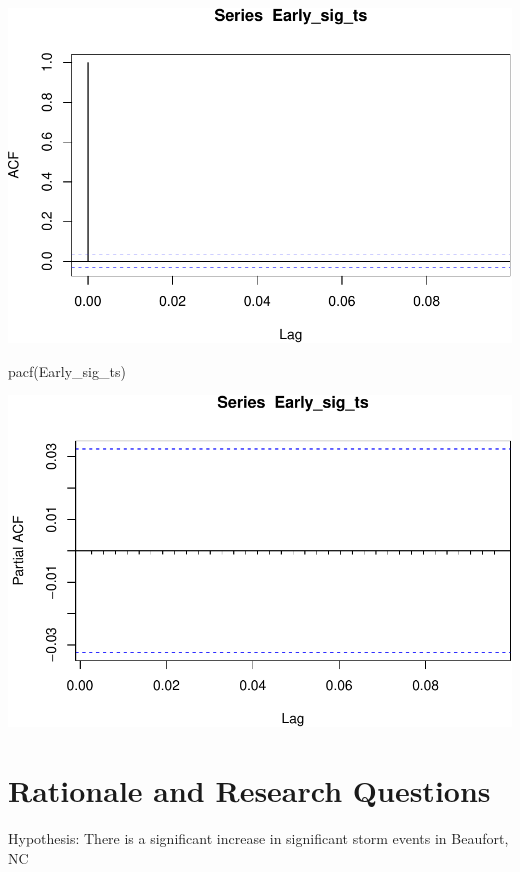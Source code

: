 \documentclass[
  12pt,
]{article}
\newenvironment{Shaded}{\begin{snugshade}}{\end{snugshade}}
\newcommand{\FunctionTok}[1]{\textcolor[rgb]{0.00,0.00,0.00}{#1}}
\newcommand{\NormalTok}[1]{#1}
\begin{document}
\includegraphics{Project_Template_TLK_files/figure-latex/unnamed-chunk-1-7.pdf}

\begin{Shaded}
\begin{Highlighting}[]
\FunctionTok{pacf}\NormalTok{(Early\_sig\_ts)}
\end{Highlighting}
\end{Shaded}

\includegraphics{Project_Template_TLK_files/figure-latex/unnamed-chunk-1-8.pdf}

\hypertarget{rationale-and-research-questions}{%
\section{Rationale and Research
Questions}\label{rationale-and-research-questions}}

Hypothesis: There is a significant increase in significant storm events
in Beaufort, NC
\end{document}
